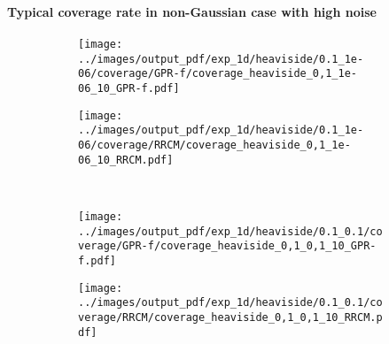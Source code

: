 \documentclass[t]{beamer}  %
\begin{document}
\begin{frame}[t]\frametitle{\insertsection}
  \framesubtitle{Typical coverage rate in non-Gaussian case with high noise}
  \begin{figure}%
    \centering
    \begin{subfigure}[b]{0.45\linewidth}
      \texttt{[image: ../images/output\_pdf/exp\_1d/heaviside/0.1\_1e-06/coverage/GPR-f/coverage\_heaviside\_0,1\_1e-06\_10\_GPR-f.pdf]}
    \end{subfigure}%
    \begin{subfigure}[b]{0.45\linewidth}
      \texttt{[image: ../images/output\_pdf/exp\_1d/heaviside/0.1\_1e-06/coverage/RRCM/coverage\_heaviside\_0,1\_1e-06\_10\_RRCM.pdf]}
    \end{subfigure}\\
    \begin{subfigure}[b]{0.45\linewidth}
      \texttt{[image: ../images/output\_pdf/exp\_1d/heaviside/0.1\_0.1/coverage/GPR-f/coverage\_heaviside\_0,1\_0,1\_10\_GPR-f.pdf]}
    \end{subfigure}%
    \begin{subfigure}[b]{0.45\linewidth}
      \texttt{[image: ../images/output\_pdf/exp\_1d/heaviside/0.1\_0.1/coverage/RRCM/coverage\_heaviside\_0,1\_0,1\_10\_RRCM.pdf]}
    \end{subfigure}\\
  \end{figure}
\end{frame}

\end{document}
